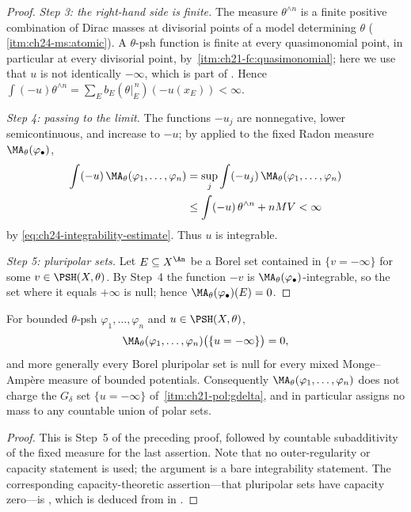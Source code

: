 \begin{proof}
\emph{Step 3: the right-hand side is finite.}  The measure
\(\theta^{\wedge n}\) is a finite positive combination of Dirac masses at
divisorial points of a model determining \(\theta\)
(\,\cref{itm:ch24-ms:atomic}).  A
\(\theta\)-psh function is finite at every quasimonomial point, in
particular at every divisorial point, by
\,\cref{itm:ch21-fc:quasimonomial}; here
we use that \(u\) is not identically \(-\infty\), which is part of
.  Hence
\(\int(-u)\theta^{\wedge n}=\sum_Eb_E(\theta|_E^{\,n})(-u(x_E))<\infty\).

\emph{Step 4: passing to the limit.}  The functions \(-u_j\) are
nonnegative, lower semicontinuous, and increase to \(-u\); by
 applied to the fixed Radon measure
\(\MA_\theta(\varphi_\bullet)\),
\[
 \begin{aligned}
 \int(-u)\,\MA_\theta(\varphi_1,\ldots,\varphi_n)
 &=\sup_j\int(-u_j)\,\MA_\theta(\varphi_1,\ldots,\varphi_n)\\
 &\leq\int(-u)\,\theta^{\wedge n}+nMV<\infty
 \end{aligned}
\]
by \eqref{eq:ch24-integrability-estimate}.  Thus \(u\) is integrable.

\emph{Step 5: pluripolar sets.}  Let \(E\subseteq X^{\An}\) be a Borel set
contained in \(\{v=-\infty\}\) for some \(v\in\PSH(X,\theta)\).  By Step~4
the function \(-v\) is \(\MA_\theta(\varphi_\bullet)\)-integrable, so the set
where it equals \(+\infty\) is null; hence
\(\MA_\theta(\varphi_\bullet)(E)=0\).
\end{proof}

\begin{corollary}
\label{cor:ch24-no-charge}
For bounded \(\theta\)-psh \(\varphi_1,\ldots,\varphi_n\) and
\(u\in\PSH(X,\theta)\),
\[
 \MA_\theta(\varphi_1,\ldots,\varphi_n)\bigl(\{u=-\infty\}\bigr)=0 ,
\]
and more generally every Borel pluripolar set is null for every mixed
Monge--Amp\`ere measure of bounded potentials.  Consequently
\(\MA_\theta(\varphi_1,\ldots,\varphi_n)\) does not charge the
\(G_\delta\) set \(\{u=-\infty\}\) of
\,\cref{itm:ch21-pol:gdelta}, and in
particular assigns no mass to any countable union of polar sets.
\end{corollary}

\begin{proof}
This is Step~5 of the preceding proof, followed by countable subadditivity
of the fixed measure for the last assertion.  Note that no outer-regularity
or capacity statement is used; the argument is a bare integrability
statement.  The corresponding capacity-theoretic assertion---that pluripolar
sets have capacity zero---is , which is
deduced from  in
.
\end{proof}

